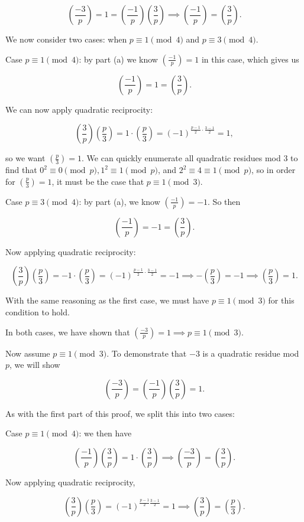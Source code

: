 \documentclass[12pt]{amsart}
\newcommand{\lsym}[2]{\ensuremath{\left(\frac{#1}{#2} \right)}}
\begin{document}
\begin{itemize}
\[\lsym{-3}{p} = 1 = \lsym{-1}{p}\lsym{3}{p}\implies \lsym{-1}{p}=\lsym{3}{p}. \]

We now consider two cases: when $p\equiv 1\pmod{4}$ and $p\equiv 3\pmod{4}$.

\bigskip

Case $p\equiv 1\pmod{4}$: by part (a) we know $\lsym{-1}{p} = 1$ in this case, which gives us 

\[\lsym{-1}{p}= 1 = \lsym{3}{p}. \]

We can now apply quadratic reciprocity:

\[\lsym{3}{p}\lsym{p}{3} = 1\cdot \lsym{p}{3} = (-1)^{\frac{p-1}{2}\cdot\frac{3-1}{2}} = 1, \]

so we want $\lsym{p}{3} = 1$. We can quickly enumerate all quadratic residues mod 3 to find that $0^2 \equiv 0\pmod{p}, 1^2 \equiv 1\pmod{p}$, and $2^2 \equiv 4 \equiv 1\pmod{p}$, so in order for $\lsym{p}{3} = 1$, it must be the case that $p\equiv 1\pmod{3}$.

\bigskip

Case $p\equiv 3\pmod{4}$: by part (a), we know $\lsym{-1}{p} = -1$. So then

\[ \lsym{-1}{p}= -1 = \lsym{3}{p}. \]

Now applying quadratic reciprocity: 

\[\lsym{3}{p}\lsym{p}{3} = -1 \cdot \lsym{p}{3} = (-1)^{\frac{p-1}{2}\cdot \frac{3-1}{2}}= -1 \implies -\lsym{p}{3}=-1\implies \lsym{p}{3}=1. \]

With the same reasoning as the first case, we must have $p\equiv 1\pmod{3}$ for this condition to hold. 

\medskip

In both cases, we have shown that $\lsym{-3}{p} = 1\implies p\equiv 1\pmod{3}$.

\bigskip

Now assume $p\equiv 1\pmod{3}$. To demonstrate that $-3$ is a quadratic residue mod $p$, we will show 

\[\lsym{-3}{p} = \lsym{-1}{p}\lsym{3}{p} = 1. \]

As with the first part of this proof, we split this into two cases:

\bigskip

Case $p\equiv 1\pmod{4}$: we then have

\[\lsym{-1}{p}\lsym{3}{p} = 1\cdot \lsym{3}{p} \implies \lsym{-3}{p} = \lsym{3}{p}.  \]

Now applying quadratic reciprocity,

\[\lsym{3}{p}\lsym{p}{3} = (-1)^{\frac{p-1}{2}\frac{3-1}{2}} = 1 \implies \lsym{3}{p} = \lsym{p}{3}. \]


\end{itemize}
\end{document}
